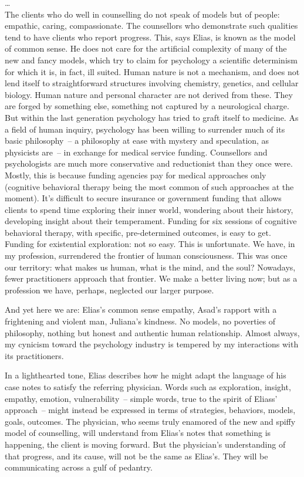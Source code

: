 \documentclass[10pt,DIV09,letterpaper,oneside,headsepline]{scrreprt}
\begin{document}
\ldots
\\
The clients who do well in counselling do not speak of models but of people: empathic, caring, compassionate. The counsellors who demonstrate such qualities tend to have clients who report progress. This, says Elias, is known as the model of common sense. He does not care for the artificial complexity of many of the new and fancy models, which try to claim for psychology a scientific determinism for which it is, in fact, ill suited. Human nature is not a mechanism, and does not lend itself to straightforward structures involving chemistry, genetics, and cellular biology. Human nature and personal character are not derived from these. They are forged by something else, something not captured by a neurological charge. But within the last generation psychology has tried to graft itself to medicine. As a field of human inquiry, psychology has been willing to surrender much of its basic philosophy~-- a philosophy at ease with mystery and speculation, as physicists are~-- in exchange for medical service funding. Counsellors and psychologists are much more conservative and reductionist than they once were. Mostly, this is because funding agencies pay for medical approaches only (cognitive behavioral therapy being the most common of such approaches at the moment). It's difficult to secure insurance or government funding that allows clients to spend time exploring their inner world, wondering about their history, developing insight about their temperament. Funding for six sessions of cognitive behavioral therapy, with specific, pre-determined outcomes, is easy to get. Funding for existential exploration: not so easy. This is unfortunate. We have, in my profession, surrendered the frontier of human consciousness. This was once our territory: what makes us human, what is the mind, and the soul? Nowadays, fewer practitioners approach that frontier. We make a better living now; but as a profession we have, perhaps, neglected our larger purpose.

And yet here we are: Elias's common sense empathy, Asad's rapport with a frightening and violent man, Juliana's kindness. No models, no poverties of philosophy, nothing but honest and authentic human relationship. Almost always, my cynicism toward the psychology industry is tempered by my interactions with its practitioners.

In a lighthearted tone, Elias describes how he might adapt the language of his case notes to satisfy the referring physician. Words such as exploration, insight, empathy, emotion, vulnerability~-- simple words, true to the spirit of Eliass' approach~-- might instead be expressed in terms of strategies, behaviors, models, goals, outcomes. The physician, who seems truly enamored of the new and spiffy model of counselling, will understand from Elias's notes that something is happening, the client is moving forward. But the physician's understanding of that progress, and its cause, will not be the same as Elias's. They will be communicating across a gulf of pedantry.
\end{document}
